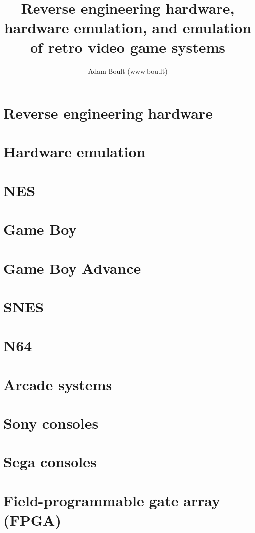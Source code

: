 \documentclass[oneside]{book}
\begin{document}
\author{Adam Boult (www.bou.lt)}
\title{Reverse engineering hardware, hardware emulation, and emulation of retro video game systems}
\maketitle

\setcounter{tocdepth}{0}
\tableofcontents



\part{Reverse engineering hardware}

\part{Hardware emulation}


\part{NES}

\part{Game Boy}

\part{Game Boy Advance}

\part{SNES}

\part{N64}

\part{Arcade systems}

\part{Sony consoles}

\part{Sega consoles}

\part{Field-programmable gate array (FPGA)}
\end{document}
